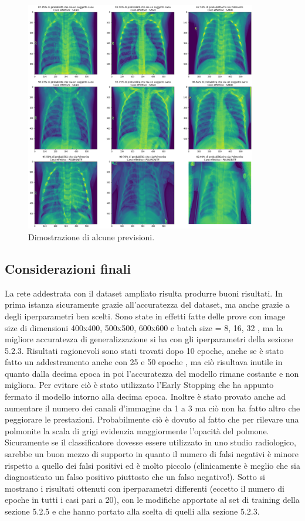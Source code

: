 \begin{figure}[H]
  \centering
  \includegraphics[width=0.9\textwidth]{Figures/test-results-pneumonia-600.png}
  \caption{\small{Dimostrazione di alcune previsioni.
  } %
  } %
  \label{fi:dcalc}
\end{figure}
 
 
 
\subsection{Considerazioni finali}
La rete addestrata con il dataset ampliato risulta produrre buoni risultati. 
In prima istanza sicuramente grazie all’accuratezza del dataset, ma anche grazie a degli iperparametri ben scelti. 
Sono state in effetti fatte delle prove con image size di dimensioni 400x400, 500x500, 600x600 e batch size = 8, 16, 32 ,
 ma la migliore accuratezza di generalizzazione si ha con gli iperparametri della sezione 5.2.3. Risultati ragionevoli 
 sono stati trovati dopo 10 epoche, anche se è stato fatto un addestramento anche con 25 e 50 epoche
 , ma ciò risultava inutile in quanto dalla decima epoca in poi l’accuratezza 
 del modello rimane costante e non migliora. Per evitare ciò è stato utilizzato l’Early Stopping che ha
  appunto fermato il modello intorno alla decima epoca. 
Inoltre è stato provato anche ad aumentare il numero dei canali d’immagine
 da 1 a 3 ma ciò non ha fatto altro che peggiorare le prestazioni. Probabilmente 
 ciò è dovuto al fatto che per rilevare una polmonite la scala di grigi evidenzia maggiormente l’opacità del polmone. 
Sicuramente se il classificatore dovesse essere utilizzato in uno studio radiologico,
 sarebbe un buon mezzo di supporto in quanto il numero di falsi negativi è minore rispetto
  a quello dei falsi positivi ed è molto piccolo (clinicamente è meglio che sia diagnosticato 
  un falso positivo piuttosto che un falso negativo!). Sotto si mostrano i risultati ottenuti con iperparametri
   differenti (eccetto il numero di epoche in tutti i casi pari a 20), con le modifiche apportate al set di training della sezione 5.2.5
    e che hanno portato alla scelta di quelli alla sezione 5.2.3.

